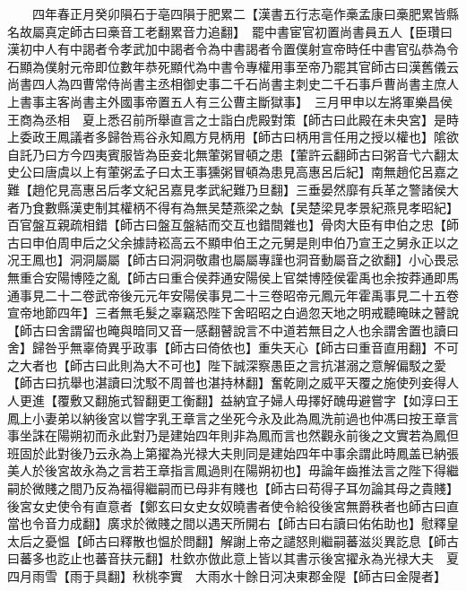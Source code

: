 　　四年春正月癸卯隕石于亳四隕于肥累二【漢書五行志亳作槀孟康曰槀肥累皆縣名故屬真定師古曰槀音工老翻累音力追翻】　罷中書宦官初置尚書員五人【臣瓚曰漢初中人有中謁者令孝武加中謁者令為中書謁者令置僕射宣帝時任中書官弘恭為令石顯為僕射元帝即位數年恭死顯代為中書令專權用事至帝乃罷其官師古曰漢舊儀云尚書四人為四曹常侍尚書主丞相御史事二千石尚書主刺史二千石事戶曹尚書主庶人上書事主客尚書主外國事帝置五人有三公曹主斷獄事】　三月甲申以左將軍樂昌侯王商為丞相　夏上悉召前所舉直言之士詣白虎殿對策【師古曰此殿在未央宮】是時上委政王鳳議者多歸咎焉谷永知鳳方見柄用【師古曰柄用言任用之授以權也】隂欲自託乃曰方今四夷賓服皆為臣妾北無葷粥冒頓之患【葷許云翻師古曰粥音弋六翻太史公曰唐虞以上有葷粥孟子曰太王事獯粥冒頓為患見高惠呂后紀】南無趙佗呂嘉之難【趙佗見高惠呂后孝文紀呂嘉見孝武紀難乃旦翻】三垂晏然靡有兵革之警諸侯大者乃食數縣漢吏制其權柄不得有為無吴楚燕梁之埶【吴楚梁見孝景紀燕見孝昭紀】百官盤互親疏相錯【師古曰盤互盤結而交互也錯間雜也】骨肉大臣有申伯之忠【師古曰申伯周申后之父余據詩崧高云不顯申伯王之元舅是則申伯乃宣王之舅永正以之况王鳳也】洞洞屬屬【師古曰洞洞敬肅也屬屬專謹也洞音動屬音之欲翻】小心畏忌無重合安陽博陸之亂【師古曰重合侯莽通安陽侯上官桀博陸侯霍禹也余按莽通即馬通事見二十二卷武帝後元元年安陽侯事見二十三卷昭帝元鳳元年霍禹事見二十五卷宣帝地節四年】三者無毛髮之辜竊恐陛下舍昭昭之白過忽天地之明戒聽晻昧之瞽說【師古曰舍謂留也晻與暗同又音一感翻瞽說言不中道若無目之人也余謂舍置也讀曰舍】歸咎乎無辜倚異乎政事【師古曰倚依也】重失天心【師古曰重音直用翻】不可之大者也【師古曰此則為大不可也】陛下誠深察愚臣之言抗湛溺之意解偏駁之愛【師古曰抗舉也湛讀曰沈駁不周普也湛持林翻】奮乾剛之威平天覆之施使列妾得人人更進【覆敷又翻施式智翻更工衡翻】益納宜子婦人毋擇好醜毋避嘗字【如淳曰王鳳上小妻弟以納後宮以嘗字乳王章言之坐死今永及此為鳳洗前過也仲馮曰按王章言事坐誅在陽朔初而永此對乃是建始四年則非為鳳而言也然觀永前後之文實若為鳳但班固於此對後乃云永為上第擢為光禄大夫則同是建始四年中事余謂此時鳳盖已納張美人於後宮故永為之言若王章指言鳳過則在陽朔初也】毋論年齒推法言之陛下得繼嗣於微賤之間乃反為福得繼嗣而已母非有賤也【師古曰苟得子耳勿論其母之貴賤】後宮女史使令有直意者【鄭玄曰女史女奴曉書者使令給役後宮無爵秩者也師古曰直當也令音力成翻】廣求於微賤之間以遇天所開右【師古曰右讀曰佑佑助也】慰釋皇太后之憂愠【師古曰釋散也愠於問翻】解謝上帝之譴怒則繼嗣蕃滋災異訖息【師古曰蕃多也訖止也蕃音扶元翻】杜欽亦倣此意上皆以其書示後宮擢永為光禄大夫　夏四月雨雪【雨于具翻】秋桃李實　大雨水十餘日河决東郡金隄【師古曰金隄者】

